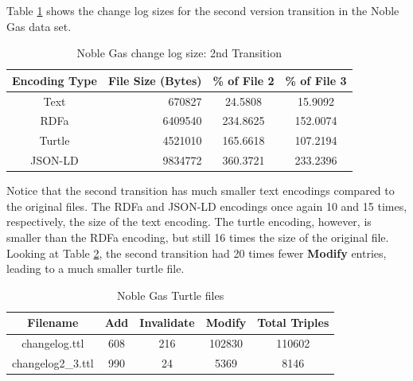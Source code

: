 Table \ref{table:Ng_changelog_table2} shows the change log sizes for the second version transition in the Noble Gas data set.
\begin{table}
	\caption{Noble Gas change log size: 2nd Transition}
	\label{table:Ng_changelog_table2}
	\centering
	\begin{tabular}{|c|r|c|c|}
		\hline
		Encoding Type & File Size (Bytes) & \% of File 2 & \% of File 3 \\
		\hline
		Text&	670827&	24.5808&	15.9092\\
		RDFa&	6409540&	234.8625&	152.0074\\
		Turtle&	4521010&	165.6618&	107.2194\\
		JSON-LD&	9834772&	360.3721&	233.2396\\
		\hline
	\end{tabular}
\end{table}
Notice that the second transition has much smaller text encodings compared to the original files.
The RDFa and JSON-LD encodings once again 10 and 15 times, respectively, the size of the text encoding.
The turtle encoding, however, is smaller than the RDFa encoding, but still 16 times the size of the original file.
Looking at Table \ref{table:Ng_turtle}, the second transition had 20 times fewer \textbf{Modify} entries, leading to a much smaller turtle file.
\begin{table}
	\caption{Noble Gas Turtle files}
	\label{table:Ng_turtle}
	\centering
	\begin{tabular}{|c|c|c|c|c|}
		\hline
		Filename&	Add&	Invalidate&	Modify&	Total Triples\\ \hline
		changelog.ttl&	608&	216&	102830&	110602\\
		changelog2\_3.ttl&	990&	24&	5369&	8146\\
		\hline
	\end{tabular}
\end{table}

